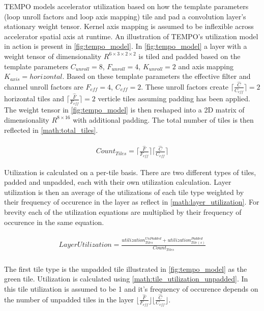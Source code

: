 TEMPO models accelerator utilization based on how the template parameters (loop
unroll factors and loop axis mapping) tile and pad a convolution layer's
stationary weight tensor.  Kernel axis mapping is assumed to be inflexible
across accelerator spatial axis at runtime. An illustration of TEMPO's
utilization model in action is present in \autoref{fig:tempo_model}. In
\autoref{fig:tempo_model} a layer with a weight tensor of dimensionality
$R^{6\times 3\times 2\times 2}$ is tiled and padded based on the template
parameters $C_{unroll}=8$, $F_{unroll}=4$, $K_{unroll}=2$ and axis mapping
$K_{axis} = horizontal$. Based on these template parameters the effective filter
and channel unroll factors are $F_{eff} = 4$, $C_{eff}=2$. These unroll factors
create $\lceil \frac{\hat{C}}{C_{eff}} \rceil = 2$ horizontal tiles and $\lceil
\frac{\hat{F}}{F_{eff}} \rceil = 2$ verticle tiles assuming padding has been
applied. The weight tensor in \autoref{fig:tempo_model} is then reshaped into a
2D matrix of dimensionality $R^{8\times 16}$ with additional padding. The total
number of tiles is then reflected in \autoref{math:total_tiles}. 

\begin{align}
    \begin{gathered}
        Count_{Tiles} = \lceil \frac{\hat{F}}{F_{eff}} \rceil \lceil \frac{\hat{C}}{C_{eff}} \rceil
        \end{gathered}
    \label{math:total_tiles}
\end{align}

Utilization is calculated on a per-tile basis. There are two different types of
tiles, padded and unpadded, each with their own utilization calculation. Layer
utilization is then an average of the utilizations of each tile type weighted by
their frequency of occurence in the layer as reflect in
\autoref{math:layer_utilization}. For brevity each of the utilization equations
are multiplied by their frequency of occurence in the same equation. 

\begin{align}
    \begin{gathered}
        LayerUtilization = \frac{utilization^{UnPadded}_{Tiles} + utilization^{Padded}_{Tile(s)}}{Count_{Tiles}} \\
            \end{gathered}
    \label{math:layer_utilization}
\end{align}

The first tile type is the unpadded tile illustrated in
\autoref{fig:tempo_model} as the green tile. Utilization is calculated using
\autoref{math:tile_utilization_unpadded}. In this tile utilization is assumed to
be 1 and it's frequency of occurence depends on the number of unpadded tiles in
the layer $\lfloor \frac{\hat{F}}{F_{eff}} \rfloor \lfloor
\frac{\hat{C}}{C_{eff}}\rfloor$. 

